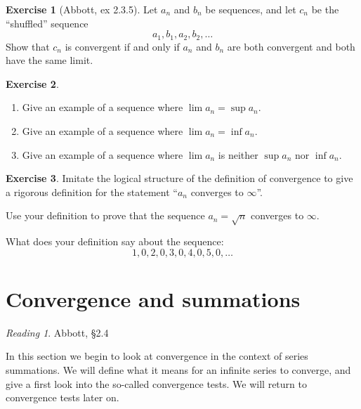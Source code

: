 \documentclass[11pt,oneside]{amsbook}
\theoremstyle{definition}
\newtheorem{exerc}{Exercise}[section]
\theoremstyle{plain}
\theoremstyle{definition}
\theoremstyle{remark}
\newtheorem*{reading}{Reading}
\numberwithin{equation}{section}
\numberwithin{figure}{section}
\begin{document}

\begin{exerc}[Abbott, ex 2.3.5]
  Let $a_n$ and $b_n$ be sequences, and let $c_n$ be the ``shuffled'' sequence
  \[a_1,b_1,a_2,b_2,\ldots
  \]
  Show that $c_n$ is convergent if and only if $a_n$ and $b_n$ are both convergent and both have the same limit.
\end{exerc}

\begin{exerc}
  \begin{enumerate}
    \item Give an example of a sequence where $\lim a_n=\sup a_n$.
    \item Give an example of a sequence where $\lim a_n=\inf a_n$.
    \item Give an example of a sequence where $\lim a_n$ is neither $\sup a_n$ nor $\inf a_n$.
  \end{enumerate}
\end{exerc}

\begin{exerc}
  Imitate the logical structure of the definition of convergence to give a rigorous definition for the statement ``$a_n$ converges to $\infty$''.

  Use your definition to prove that the sequence $a_n=\sqrt{n}$ converges to $\infty$.

  What does your definition say about the sequence:
  \[1,0,2,0,3,0,4,0,5,0,\ldots
  \]
\end{exerc}

\newpage
\section{Convergence and summations}

\begin{reading}
  Abbott, \S 2.4
\end{reading}

In this section we begin to look at convergence in the context of series summations. We will define what it means for an infinite series to converge, and give a first look into the so-called convergence tests. We will return to convergence tests later on.
\end{document}
